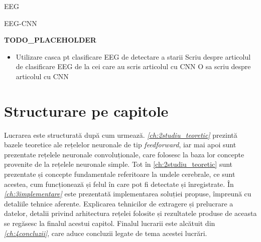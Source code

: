 EEG\cite{eeg:2018}

EEG-CNN\cite{eeg-cnn:2020}

\textbf{TODO\_PLACEHOLDER}
\begin{itemize}
	\item Utilizare casca pt clasificare EEG de detectare a starii
	\subitem Scriu despre articolul de clasificare EEG de la cei care au scris articolul cu CNN
	\subitem O sa scriu despre articolul cu CNN
\end{itemize}

\section{Structurare pe capitole}
Lucrarea este structurată după cum urmează. \textit{\autoref{ch:2studiu_teoretic}} prezintă bazele teoretice ale rețelelor neuronale de tip \textit{feedforward}, iar mai apoi sunt prezentate rețelele neuronale convoluționale, care folosesc la baza lor concepte provenite de la rețelele neuronale simple. Tot în \autoref{ch:2studiu_teoretic} sunt prezentate și concepte fundamentale referitoare la undele cerebrale, ce sunt acestea, cum funcționează și felul în care pot fi detectate și înregistrate. În \textit{\autoref{ch:3implementare}} este prezentată implementarea soluției propuse, împreună cu detaliile tehnice aferente. Explicarea tehnicilor de extragere și prelucrare a datelor, detalii privind arhitectura rețelei folosite și rezultatele produse de aceasta se regăsesc la finalul acestui capitol. Finalul lucrarii este alcătuit din \textit{\autoref{ch:4concluzii}}, care aduce concluzii legate de tema acestei lucrări.